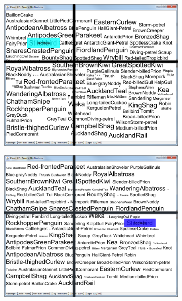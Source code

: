 \begin{figure}[!htb]
\begin{subfigure}{.5\textwidth}
  \includegraphics[scale=0.25]{Experiment2/T2/M1Spiral.png}
\end{subfigure}%
\begin{subfigure}{.5\textwidth}
  \centering
  \includegraphics[scale=0.25]{Experiment2/T2/M1Typewriter.png}
\end{subfigure}
\begin{subfigure}{.5\textwidth}
  \centering

\end{subfigure}
\end{figure}
